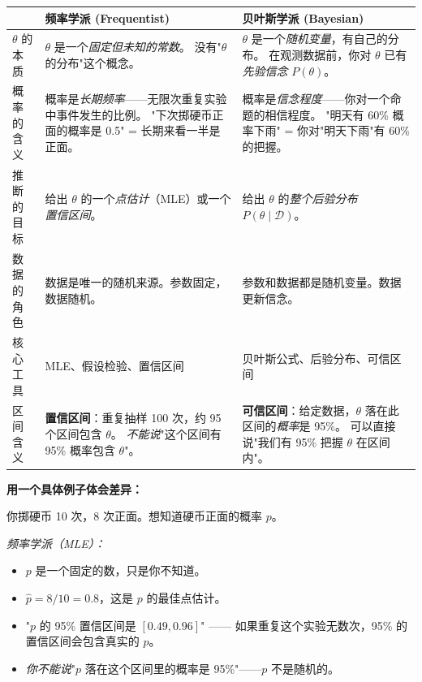 \begin{center}
\renewcommand{\arraystretch}{1.6}
\begin{tabular}{p{2.5cm}|p{5.5cm}|p{5.5cm}}
\toprule
& \textbf{频率学派 (Frequentist)} & \textbf{贝叶斯学派 (Bayesian)} \\
\midrule
$\theta$ 的本质
    & $\theta$ 是一个\emph{固定但未知的常数}。
      没有"$\theta$ 的分布"这个概念。
    & $\theta$ 是一个\emph{随机变量}，有自己的分布。
      在观测数据前，你对 $\theta$ 已有\emph{先验信念} $P(\theta)$。 \\
\midrule
概率的含义
    & 概率是\emph{长期频率}——无限次重复实验中事件发生的比例。
      "下次掷硬币正面的概率是 0.5" = 长期来看一半是正面。
    & 概率是\emph{信念程度}——你对一个命题的相信程度。
      "明天有 60\% 概率下雨" = 你对"明天下雨"有 60\% 的把握。 \\
\midrule
推断的目标
    & 给出 $\theta$ 的一个\emph{点估计}（MLE）或一个\emph{置信区间}。
    & 给出 $\theta$ 的\emph{整个后验分布} $P(\theta \mid \mathcal{D})$。 \\
\midrule
数据的角色
    & 数据是唯一的随机来源。参数固定，数据随机。 & 参数和数据都是随机变量。数据更新信念。 \\
\midrule
核心工具
    & MLE、假设检验、置信区间 & 贝叶斯公式、后验分布、可信区间 \\
\midrule
区间含义
    & \textbf{置信区间}：重复抽样 100 次，约 95 个区间包含 $\theta$。
      \emph{不能说}"这个区间有 95\% 概率包含 $\theta$"。
    & \textbf{可信区间}：给定数据，$\theta$ 落在此区间的\emph{概率}是 95\%。
      可以直接说"我们有 95\% 把握 $\theta$ 在区间内"。 \\
\bottomrule
\end{tabular}
\end{center}

\medskip
\textbf{用一个具体例子体会差异：}

你掷硬币 10 次，8 次正面。想知道硬币正面的概率 $p$。

\emph{频率学派（MLE）：}
\begin{itemize}
    \item $p$ 是一个固定的数，只是你不知道。
    \item $\hat{p} = 8/10 = 0.8$，这是 $p$ 的最佳点估计。
    \item "$p$ 的 95\% 置信区间是 $[0.49, 0.96]$" —— 如果重复这个实验无数次，95\% 的置信区间会包含真实的 $p$。
    \item \emph{你不能说}"$p$ 落在这个区间里的概率是 95\%"——$p$ 不是随机的。
\end{itemize}

